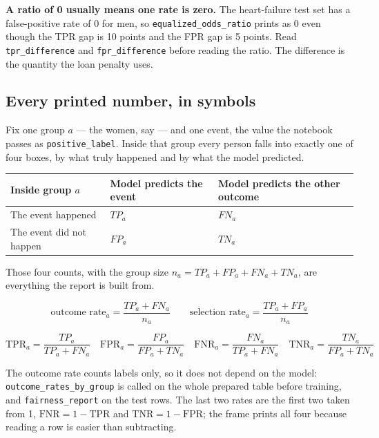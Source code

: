 \documentclass[11pt]{article}
\newcommand{\fn}[1]{\texttt{\small #1}}
\begin{document}
\begin{careful}
\textbf{A ratio of 0 usually means one rate is zero.} The heart-failure test set has a false-positive rate of 0 for men, so \fn{equalized\_odds\_ratio} prints as 0 even though the TPR gap is 10 points and the FPR gap is 5 points. Read \fn{tpr\_difference} and \fn{fpr\_difference} before reading the ratio. The difference is the quantity the loan penalty uses.
\end{careful}

\subsection{Every printed number, in symbols}
\label{sec:formulas}

Fix one group \(a\) --- the women, say --- and one event, the value the notebook passes as \fn{positive\_label}. Inside that group every person falls into exactly one of four boxes, by what truly happened and by what the model predicted.

\begin{table}[H]
\centering
\small
\begin{tabularx}{\textwidth}{@{}l Y Y@{}}
\toprule
Inside group \(a\) & Model predicts the event & Model predicts the other outcome \\
\midrule
The event happened & \(TP_a\) & \(FN_a\) \\
The event did not happen & \(FP_a\) & \(TN_a\) \\
\bottomrule
\end{tabularx}
\end{table}

\noindent
Those four counts, with the group size \(n_a = TP_a + FP_a + FN_a + TN_a\), are everything the report is built from.

\[
\text{outcome rate}_a = \frac{TP_a + FN_a}{n_a}
\qquad
\text{selection rate}_a = \frac{TP_a + FP_a}{n_a}
\]

\[
\mathrm{TPR}_a = \frac{TP_a}{TP_a + FN_a}
\quad
\mathrm{FPR}_a = \frac{FP_a}{FP_a + TN_a}
\quad
\mathrm{FNR}_a = \frac{FN_a}{TP_a + FN_a}
\quad
\mathrm{TNR}_a = \frac{TN_a}{FP_a + TN_a}
\]

The outcome rate counts labels only, so it does not depend on the model: \fn{outcome\_rates\_by\_group} is called on the whole prepared table before training, and \fn{fairness\_report} on the test rows. The last two rates are the first two taken from 1, \(\mathrm{FNR} = 1 - \mathrm{TPR}\) and \(\mathrm{TNR} = 1 - \mathrm{FPR}\); the frame prints all four because reading a row is easier than subtracting.
\end{document}
